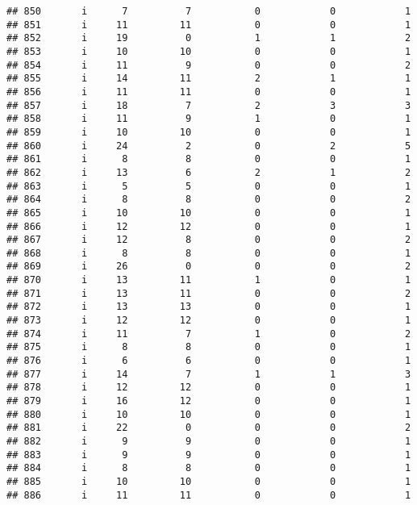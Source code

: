 \documentclass[
]{article}
\begin{document}
\begin{verbatim}
## 850       i      7          7           0            0            1
## 851       i     11         11           0            0            1
## 852       i     19          0           1            1            2
## 853       i     10         10           0            0            1
## 854       i     11          9           0            0            2
## 855       i     14         11           2            1            1
## 856       i     11         11           0            0            1
## 857       i     18          7           2            3            3
## 858       i     11          9           1            0            1
## 859       i     10         10           0            0            1
## 860       i     24          2           0            2            5
## 861       i      8          8           0            0            1
## 862       i     13          6           2            1            2
## 863       i      5          5           0            0            1
## 864       i      8          8           0            0            2
## 865       i     10         10           0            0            1
## 866       i     12         12           0            0            1
## 867       i     12          8           0            0            2
## 868       i      8          8           0            0            1
## 869       i     26          0           0            0            2
## 870       i     13         11           1            0            1
## 871       i     13         11           0            0            2
## 872       i     13         13           0            0            1
## 873       i     12         12           0            0            1
## 874       i     11          7           1            0            2
## 875       i      8          8           0            0            1
## 876       i      6          6           0            0            1
## 877       i     14          7           1            1            3
## 878       i     12         12           0            0            1
## 879       i     16         12           0            0            1
## 880       i     10         10           0            0            1
## 881       i     22          0           0            0            2
## 882       i      9          9           0            0            1
## 883       i      9          9           0            0            1
## 884       i      8          8           0            0            1
## 885       i     10         10           0            0            1
## 886       i     11         11           0            0            1

\end{verbatim}
\end{document}
